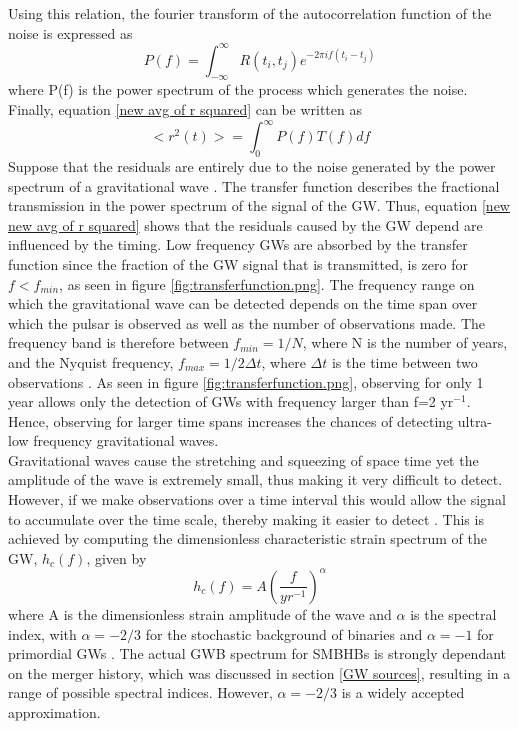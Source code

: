 \documentclass[12pt]{article}
\begin{document}
	Using this relation, the fourier transform of the autocorrelation function of the noise is expressed as
	\begin{equation}
	P(f)=\int_{-\infty}^{\infty}R(t_i,t_j)e^{-2 \pi i f(t_i-t_j)}
	\end{equation}
	where P(f) is the power spectrum of the process which generates the noise. Finally, equation \ref{new avg of r squared} can be written as 
	\begin{equation}\label{new new avg of r squared}
	<r^{2}(t)>=\int_{0}^{\infty}P(f)T(f)df
	\end{equation}
	Suppose that the residuals are entirely due to the noise generated by the power spectrum of a gravitational wave \cite{blandford1976arrival}. The transfer function describes the fractional transmission in the power spectrum of the signal of the GW. Thus, equation \ref{new new avg of r squared} shows that the residuals caused by the GW depend are influenced by the timing. Low frequency GWs are absorbed by the transfer function since the fraction of the GW signal that is transmitted, is zero for $f<f_{min}$, as seen in figure \ref{fig:transferfunction.png}. The frequency range on which the gravitational wave can be detected \cite{hobbs2009international} depends on the time span over which the pulsar is observed as well as the number of observations made. The frequency band is therefore between $f_{min}=1/N$, where N is the number of years, and the Nyquist frequency, $f_{max}=1/{2\Delta t}$, where $\Delta t$ is the time between two observations \cite{sesana2010gravitational}. As seen in figure \ref{fig:transferfunction.png}, observing for only 1 year allows only the detection of GWs with frequency larger than f=2 yr$^{-1}$. Hence, observing for larger time spans increases the chances of detecting ultra-low frequency gravitational waves. \\ Gravitational waves cause the stretching and squeezing of space time yet the amplitude of the wave is extremely small, thus making it very difficult to detect. However, if we make observations over a time interval this would allow the signal to accumulate over the time scale, thereby making it easier to detect \cite{moore2014gravitational}. This is achieved by computing the dimensionless characteristic strain spectrum of the GW, $h_{c}(f)$, given by \cite{moore2014gravitational}
	\begin{equation}\label{charac strain}
	h_{c}(f)=A (\frac{f}{yr^{-1}})^{\alpha}
	\end{equation}
	where A is the dimensionless strain amplitude of the wave and $\alpha$ is the spectral index, with $\alpha=-2/3$ for the stochastic background of binaries \cite{moore2014gravitational} and $\alpha=-1$ for primordial GWs \cite{zhao2013constraints}. The actual GWB spectrum for SMBHBs is strongly dependant on the merger history, which was discussed in section \ref{GW sources}, resulting in a range of possible spectral indices. However, $\alpha = −2/3$ is a widely accepted approximation. \\
\end{document}
